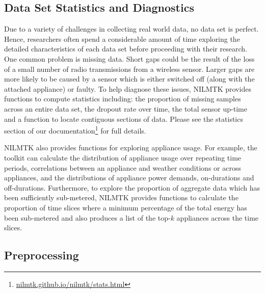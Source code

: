 \documentclass{sig-alternate}
\begin{document}
\subsection{Data Set Statistics and Diagnostics}

\noindent
Due to a variety of challenges in collecting real world data, no data set is perfect. Hence, researchers often spend a considerable amount of time exploring the detailed characteristics of each data set before proceeding with their research. One common problem is missing data.  Short gaps could be the result of 
the loss of a small number of radio transmissions from a wireless sensor. Larger gaps are more likely to be caused by a sensor which is either switched off (along with the attached appliance) or faulty.  To help diagnose these issues, NILMTK provides functions to compute statistics including: the proportion of missing samples across an entire data set, 
the dropout rate over time, the total sensor up-time and a function to locate contiguous sections of data. Please see the statistics section of our documentation\footnote{ \url{nilmtk.github.io/nilmtk/stats.html}} for full details.

NILMTK also provides functions for exploring appliance usage.  For example, the toolkit can calculate the distribution of appliance usage over repeating time periods, correlations between an appliance and weather conditions or across appliances, and the distributions of appliance power demands, on-durations and off-durations.  Furthermore, to explore the proportion of aggregate data which has been sufficiently sub-metered, NILMTK provides functions to calculate the proportion of time slices where a minimum percentage of the total energy has been sub-metered and also produces a list of the top-$k$ appliances across the time slices.

\subsection{Preprocessing}
\label{sec:preprocessing}
\end{document}
